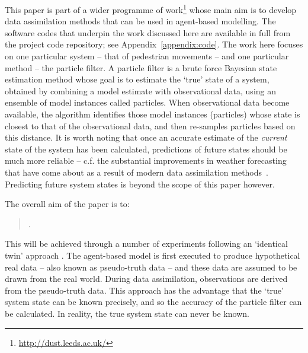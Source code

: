 This paper is part of a wider programme of work\footnote{\url{http://dust.leeds.ac.uk/}} whose main aim is to develop data assimilation methods that can be used in agent-based modelling. The software codes that underpin the work discussed here are available in full from the project code repository; see Appendix~\ref{appendix:code}. The work here focuses on one particular system -- that of pedestrian movements -- and one particular method -- the particle filter. A particle filter is a brute force Bayesian state estimation method whose goal is to estimate the `true' state of a system, obtained by combining a model estimate with observational data, using an ensemble of model instances called particles. When observational data become available, the algorithm identifies those model instances (particles) whose state is closest to that of the observational data, and then re-samples particles based on this distance. It is worth noting that once an accurate estimate of the \textit{current} state of the system has been calculated, predictions of future states should be much more reliable -- c.f. the substantial improvements in weather forecasting that have come about as a result of modern data assimilation methods~\citep{kalnay_atmospheric_2003}. Predicting future system states is beyond the scope of this paper however.

The overall aim of the paper is to: \begin{quote}\textit{\aim}.\end{quote} This will be achieved through a number of experiments following an `identical twin' approach \citep{wang_data_2015}. The agent-based model is first executed to produce hypothetical real data -- also known as pseudo-truth \citep{grazzini_bayesian_2017} data -- and these data are assumed to be drawn from the real world. During data assimilation, observations are derived from the pseudo-truth data. This approach has the advantage that the `true' system state can be known precisely, and so the accuracy of the particle filter can be calculated. In reality, the true system state can never be known.

